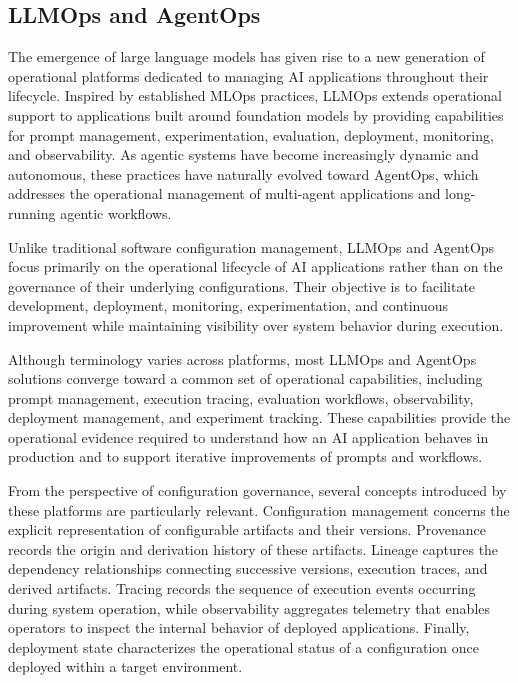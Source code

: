 \documentclass[10pt]{article}
\begin{document}
\subsection{LLMOps and AgentOps}
\label{sec:llmops_agentops}

The emergence of large language models has given rise to a new generation of operational platforms dedicated to managing AI applications throughout their lifecycle. Inspired by established MLOps practices, LLMOps extends operational support to applications built around foundation models by providing capabilities for prompt management, experimentation, evaluation, deployment, monitoring, and observability. As agentic systems have become increasingly dynamic and autonomous, these practices have naturally evolved toward AgentOps, which addresses the operational management of multi-agent applications and long-running agentic workflows.

Unlike traditional software configuration management, LLMOps and AgentOps focus primarily on the operational lifecycle of AI applications rather than on the governance of their underlying configurations. Their objective is to facilitate development, deployment, monitoring, experimentation, and continuous improvement while maintaining visibility over system behavior during execution.

Although terminology varies across platforms, most LLMOps and AgentOps solutions converge toward a common set of operational capabilities, including prompt management, execution tracing, evaluation workflows, observability, deployment management, and experiment tracking. These capabilities provide the operational evidence required to understand how an AI application behaves in production and to support iterative improvements of prompts and workflows.

From the perspective of configuration governance, several concepts introduced by these platforms are particularly relevant. Configuration management concerns the explicit representation of configurable artifacts and their versions. Provenance records the origin and derivation history of these artifacts. Lineage captures the dependency relationships connecting successive versions, execution traces, and derived artifacts. Tracing records the sequence of execution events occurring during system operation, while observability aggregates telemetry that enables operators to inspect the internal behavior of deployed applications. Finally, deployment state characterizes the operational status of a configuration once deployed within a target environment.
\end{document}
